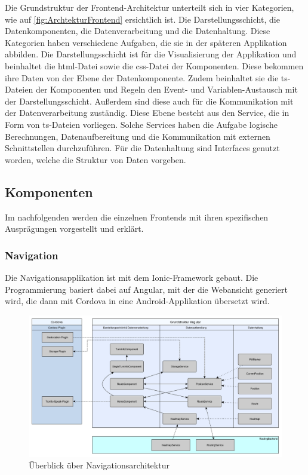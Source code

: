 Die Grundstruktur der Frontend-Architektur unterteilt sich in vier Kategorien, wie auf \ref{fig:ArchtekturFrontend} ersichtlich ist. Die Darstellungsschicht, die Datenkomponenten, die Datenverarbeitung und die Datenhaltung. 
Diese Kategorien haben verschiedene Aufgaben, die sie in der späteren Applikation abbilden. 
Die Darstellungsschicht ist für die Visualisierung der Applikation und beinhaltet die html-Datei sowie die css-Datei der Komponenten. 
Diese bekommen ihre Daten von der Ebene der Datenkomponente. 
Zudem beinhaltet sie die ts-Dateien der Komponenten und Regeln den Event- und Variablen-Austausch mit der Darstellungsschicht. 
Außerdem sind diese auch für die Kommunikation mit der Datenverarbeitung zuständig. 
Diese Ebene besteht aus den Service, die in Form von ts-Dateien vorliegen. 
Solche Services haben die Aufgabe logische Berechnungen, Datenaufbereitung und die Kommunikation mit externen Schnittstellen durchzuführen. 
Für die Datenhaltung sind Interfaces genutzt worden, welche die Struktur von Daten vorgeben. 

\subsection{Komponenten}
Im nachfolgenden werden die einzelnen Frontends mit ihren spezifischen Ausprägungen vorgestellt und erklärt. 

\subsubsection{Navigation}
Die Navigationsapplikation ist mit dem Ionic-Framework gebaut. 
Die Programmierung basiert dabei auf Angular, mit der die Webansicht generiert wird, die dann mit Cordova in eine Android-Applikation übersetzt wird.

\begin{figure}[!htb]
	\centering
	\includegraphics[width=\textwidth]{ressourcen/Architektur-Navigation}
	\caption{Überblick über Navigationsarchitektur}
	\label{fig:ArchtekturNavigation}
\end{figure}

